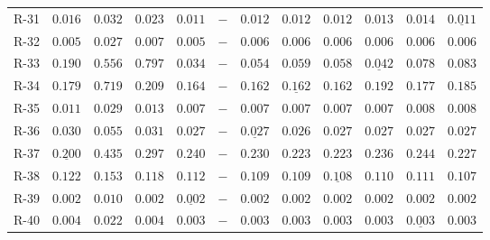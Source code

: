 {\begin{longtable}[t]{p{1cm}|p{1cm}|p{1cm}|p{1cm}|p{1cm}|p{1cm}|cccccc}
R-31 & $0.016$ & $0.032$ & $0.023$ & $\bm{0.011}$ & $-$ & $0.012$ & $0.012$ & $0.012$ & $0.013$ & $0.014$ & $\underline{0.011}$ \\
R-32 & $0.005$ & $0.027$ & $0.007$ & $\bm{0.005}$ & $-$ & $0.006$ & $0.006$ & $0.006$ & $0.006$ & $0.006$ & $0.006$ \\
R-33 & $0.190$ & $0.556$ & $0.797$ & $\bm{0.034}$ & $-$ & $0.054$ & $0.059$ & $0.058$ & $\underline{0.042}$ & $0.078$ & $0.083$ \\
R-34 & $0.179$ & $0.719$ & $0.209$ & $0.164$ & $-$ & $\bm{0.162}$ & $\underline{0.162}$ & $0.162$ & $0.192$ & $0.177$ & $0.185$ \\
R-35 & $0.011$ & $0.029$ & $0.013$ & $\bm{0.007}$ & $-$ & $0.007$ & $0.007$ & $0.007$ & $0.007$ & $0.008$ & $0.008$ \\
R-36 & $0.030$ & $0.055$ & $0.031$ & $0.027$ & $-$ & $\underline{0.027}$ & $\bm{0.026}$ & $0.027$ & $0.027$ & $0.027$ & $0.027$ \\
R-37 & $\underline{0.200}$ & $0.435$ & $0.297$ & $0.240$ & $-$ & $0.230$ & $0.223$ & $0.223$ & $0.236$ & $0.244$ & $0.227$ \\
R-38 & $0.122$ & $0.153$ & $0.118$ & $0.112$ & $-$ & $0.109$ & $0.109$ & $\underline{0.108}$ & $0.110$ & $0.111$ & $\bm{0.107}$ \\
R-39 & $0.002$ & $0.010$ & $0.002$ & $\underline{0.002}$ & $-$ & $0.002$ & $0.002$ & $0.002$ & $0.002$ & $0.002$ & $0.002$ \\
R-40 & $0.004$ & $0.022$ & $0.004$ & $\bm{0.003}$ & $-$ & $0.003$ & $0.003$ & $0.003$ & $0.003$ & $\underline{0.003}$ & $0.003$ \\
\bottomrule
\end{longtable}
}
